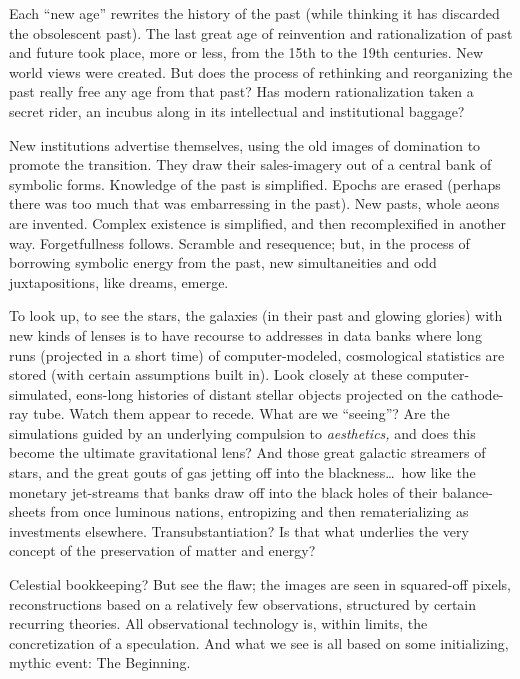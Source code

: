 Each \enquote{new age} rewrites the history of the past (while thinking it has discarded the
obsolescent past). The last great age of reinvention and rationalization of past and future took
place, more or less, from the 15th to the 19th centuries. New world views were created. But does the
process of rethinking and reorganizing the past really free any age from that past? Has modern
rationalization taken a secret rider, an incubus along in its intellectual and institutional
baggage? 

New institutions advertise themselves, using the old images of domination to promote the transition.
They draw their sales-imagery out of a central bank of symbolic forms. Knowledge of the past is
simplified. Epochs are erased (perhaps there was too much that was embarressing in the past). New
pasts, whole aeons are invented. Complex existence is simplified, and then recomplexified in another
way. Forgetfullness follows. Scramble and resequence; but, in the process of borrowing symbolic
energy from the past, new simultaneities and odd juxtapositions, like dreams, emerge. 

To look up, to see the stars, the galaxies (in their past and glowing glories) with new kinds of
lenses is to have recourse to addresses in data banks where long runs (projected in a short time) of
computer-modeled, cosmological statistics are stored (with certain assumptions built in). Look
closely at these computer-simulated, eons-long histories of distant stellar objects projected on the
cathode-ray tube. Watch them appear to recede. What are we \enquote{seeing}? Are the simulations
guided by an underlying compulsion to \emph{aesthetics,} and does this become the ultimate
gravitational lens? And those great galactic streamers of stars, and the great gouts of gas jetting
off into the blackness\ldots\ how like the monetary jet-streams that banks draw off into the black
holes of their balance-sheets from once luminous nations, entropizing and then rematerializing as
investments elsewhere. Transubstantiation? Is that what underlies the very concept of the
preservation of matter and energy? 

Celestial bookkeeping? But see the flaw; the images are seen in squared-off pixels, reconstructions
based on a relatively few observations, structured by certain recurring theories. All observational
technology is, within limits, the concretization of a speculation. And what we see is all based on
some initializing, mythic event: The Beginning. 

